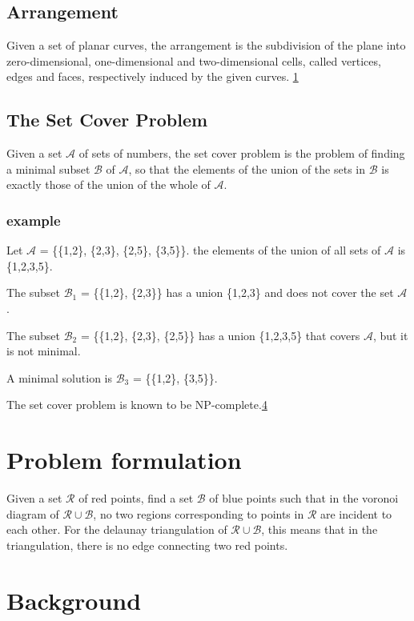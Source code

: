 \documentclass[a4paper,12pt]{article}
\begin{document}
\subsection{Arrangement}
\label{sec:arrangement}
Given a set of planar curves, the arrangement is the subdivision of the plane into zero-dimensional, one-dimensional and two-dimensional cells, called vertices, edges and faces, respectively induced by the given curves. \hyperref[ref:cgal]{1}

\subsection{The Set Cover Problem}
Given a set $\mathcal A$ of sets of numbers, the set cover problem is the problem of finding a minimal subset $\mathcal B$ of $\mathcal A$, so that the elements of the union of the sets in $\mathcal B$ is exactly those of the union of the whole of $\mathcal A$.

\subsubsection{example}
Let $\mathcal A$ =  \{\{1,2\}, \{2,3\}, \{2,5\}, \{3,5\}\}. the elements of the union of all sets of $\mathcal A$ is \{1,2,3,5\}.

The subset $\mathcal B_1$ = \{\{1,2\}, \{2,3\}\} has a union \{1,2,3\} and does not cover the set $\mathcal A$.

The subset $\mathcal B_2$ = \{\{1,2\}, \{2,3\}, \{2,5\}\} has a union \{1,2,3,5\} that covers $\mathcal A$, but it is not minimal.

A minimal solution is $\mathcal B_3$ = \{\{1,2\}, \{3,5\}\}.

The set cover problem is known to be NP-complete.\hyperref[ref:karp]{4}
\section{Problem formulation}
Given a set $\mathcal{R}$ of red points, find a set $\mathcal{B}$ of blue points such that in the voronoi diagram of $\mathcal{R} \cup \mathcal{B}$, no two regions corresponding to points in $\mathcal{R}$ are incident to each other. For the delaunay triangulation of $\mathcal{R} \cup \mathcal{B}$, this means that in the triangulation, there is no edge connecting two red points.


\section{Background}
\end{document}
